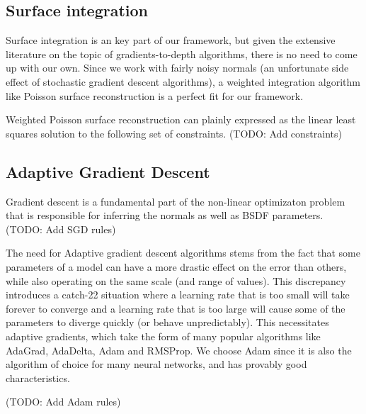 \subsection{Surface integration}
Surface integration is an key part of our framework, but given the extensive literature on the topic of gradients-to-depth algorithms, there is no need to come up with our own. Since we work with fairly noisy normals (an unfortunate side effect of stochastic gradient descent algorithms), a weighted integration algorithm like Poisson surface reconstruction is a perfect fit for our framework.

Weighted Poisson surface reconstruction can plainly expressed as the linear least squares solution to the following set of constraints.
(TODO: Add constraints)

\subsection{Adaptive Gradient Descent}
Gradient descent is a fundamental part of the non-linear optimizaton problem that is responsible for inferring the normals as well as BSDF parameters.
(TODO: Add SGD rules)

The need for Adaptive gradient descent algorithms stems from the fact that some parameters of a model can have a more drastic effect on the error than others, while also operating on the same scale (and range of values). This discrepancy introduces a catch-22 situation where a learning rate that is too small will take forever to converge and a learning rate that is too large will cause some of the parameters to diverge quickly (or behave unpredictably). This necessitates adaptive gradients, which take the form of many popular algorithms like AdaGrad, AdaDelta, Adam and RMSProp. We choose Adam since it is also the algorithm of choice for many neural networks, and has provably good characteristics.

(TODO: Add Adam rules)